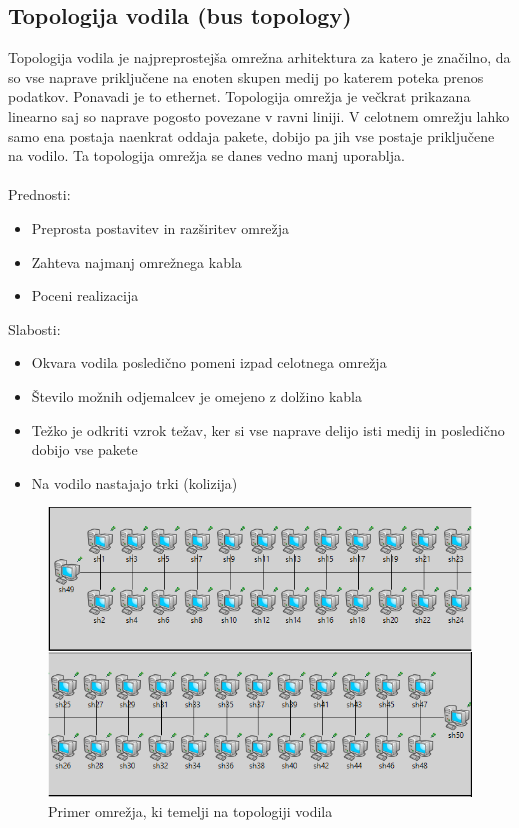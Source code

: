 \documentclass[11pt,a4paper,slovene]{myarticle}
\begin{document}
\subsection{Topologija vodila (bus topology)}
Topologija vodila je najpreprostejša omrežna arhitektura za katero je značilno, da so vse naprave priključene na enoten skupen medij po katerem poteka prenos podatkov. Ponavadi je to ethernet. Topologija omrežja je večkrat prikazana linearno saj so naprave pogosto povezane v ravni liniji. V celotnem omrežju lahko samo ena postaja naenkrat oddaja pakete, dobijo pa jih vse postaje priključene na vodilo. Ta topologija omrežja se danes vedno manj uporablja.
\\
\\
Prednosti:
\begin{itemize}
\item Preprosta postavitev in razširitev omrežja
\item Zahteva najmanj omrežnega kabla
\item Poceni realizacija
\end{itemize}
\pagebreak
Slabosti:
\begin{itemize}
\item Okvara vodila posledično pomeni izpad celotnega omrežja
\item Število možnih odjemalcev je omejeno z dolžino kabla
\item Težko je odkriti vzrok težav, ker si vse naprave delijo isti medij in posledično dobijo vse pakete
\item Na vodilo nastajajo trki (kolizija)
\end{itemize}
\begin{figure}[H]
\includegraphics[scale=0.75]{slike/bus.png}
\caption{Primer omrežja, ki temelji na topologiji vodila}
\end{figure}

\pagebreak


\end{document}
